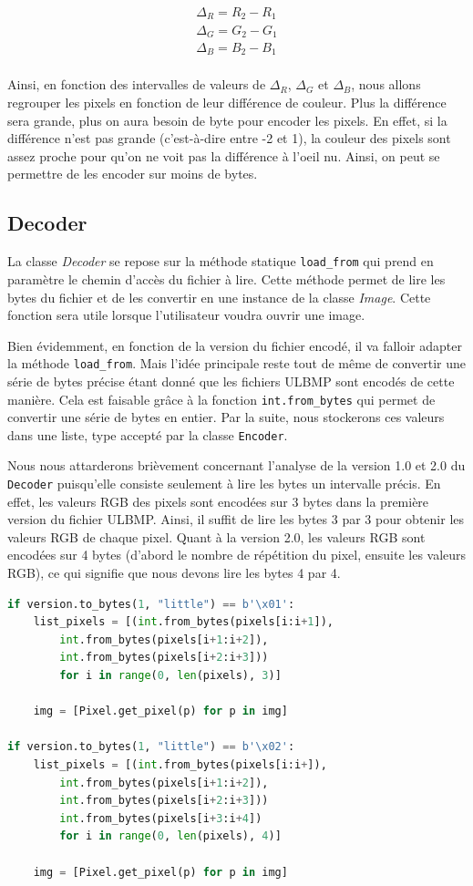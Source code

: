 \documentclass[utf8]{article}
\begin{document}
\begin{align*}
		\Delta_R = R_2 - R_1 \\
		\Delta_G = G_2 - G_1 \\
		\Delta_B =  B_2 - B_1 \\
\end{align*}

Ainsi, en fonction des intervalles de valeurs de $\Delta_R$, $\Delta_G$ et $\Delta_B$, nous allons regrouper les pixels en fonction de leur différence de couleur. Plus la différence sera grande, plus on aura besoin de byte pour encoder les pixels. En effet, si la différence n'est pas grande (c'est-à-dire entre -2 et 1), la couleur des pixels sont assez proche pour qu'on ne voit pas la différence à l'oeil nu. Ainsi, on peut se permettre de les encoder sur moins de bytes.

\subsection{Decoder}
La classe \textit{Decoder} se repose sur la méthode statique \texttt{load_from} qui prend en paramètre le chemin d'accès du fichier à lire. Cette méthode permet de lire les bytes du fichier et de les convertir en une instance de la classe \textit{Image}. Cette fonction sera utile lorsque l'utilisateur voudra ouvrir une image.


Bien évidemment, en fonction de la version du fichier encodé, il va falloir adapter la méthode \texttt{load_from}. Mais l'idée principale reste tout de même de convertir une série de bytes précise étant donné que les fichiers ULBMP sont encodés de cette manière. Cela est faisable grâce à la fonction \texttt{int.from_bytes} qui permet de convertir une série de bytes en entier. Par la suite, nous stockerons ces valeurs dans une liste, type accepté par la classe \texttt{Encoder}.


Nous nous attarderons brièvement concernant l'analyse de la version 1.0 et 2.0 du \texttt{Decoder} puisqu'elle consiste seulement à lire les bytes un intervalle précis. En effet, les valeurs RGB des pixels sont encodées sur 3 bytes dans la première version du fichier ULBMP. Ainsi, il suffit de lire les bytes 3 par 3 pour obtenir les valeurs RGB de chaque pixel. Quant à la version 2.0, les valeurs RGB sont encodées sur 4 bytes (d'abord le nombre de répétition du pixel, ensuite les valeurs RGB), ce qui signifie que nous devons lire les bytes 4 par 4.

\begin{lstlisting}[language=Python, basicstyle=\small]
if version.to_bytes(1, "little") == b'\x01':
	list_pixels = [(int.from_bytes(pixels[i:i+1]), 
		int.from_bytes(pixels[i+1:i+2]), 
		int.from_bytes(pixels[i+2:i+3])) 
		for i in range(0, len(pixels), 3)]

	img = [Pixel.get_pixel(p) for p in img]

if version.to_bytes(1, "little") == b'\x02':
	list_pixels = [(int.from_bytes(pixels[i:i+]), 
		int.from_bytes(pixels[i+1:i+2]),
		int.from_bytes(pixels[i+2:i+3]))
		int.from_bytes(pixels[i+3:i+4])
		for i in range(0, len(pixels), 4)]
	 
	img = [Pixel.get_pixel(p) for p in img]
\end{lstlisting}
\end{document}
